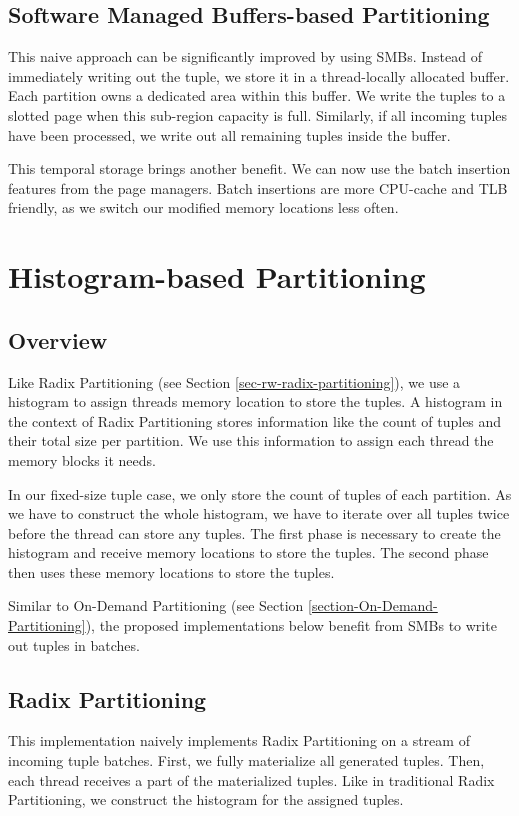 \subsection{Software Managed Buffers-based Partitioning}

This naive approach can be significantly improved by using \acfp{SMB}.
Instead of immediately writing out the tuple, we store it in a thread-locally allocated buffer.
Each partition owns a dedicated area within this buffer.
We write the tuples to a slotted page when this sub-region capacity is full.
Similarly, if all incoming tuples have been processed, we write out all remaining tuples inside the buffer.

This temporal storage brings another benefit.
We can now use the batch insertion features from the page managers.
Batch insertions are more \ac{CPU}-cache and \ac{TLB} friendly, as we switch our modified memory locations less often.

\section{Histogram-based Partitioning}\label{section-histogram-based-partitioning}
\subsection{Overview}
Like Radix Partitioning (see Section \ref{sec-rw-radix-partitioning}), we use a histogram to assign threads memory location to store the tuples.
A histogram in the context of Radix Partitioning stores information like the count of tuples and their total size per partition.
We use this information to assign each thread the memory blocks it needs.

In our fixed-size tuple case, we only store the count of tuples of each partition.
As we have to construct the whole histogram, we have to iterate over all tuples twice before the thread can store any tuples.
The first phase is necessary to create the histogram and receive memory locations to store the tuples.
The second phase then uses these memory locations to store the tuples.

Similar to On-Demand Partitioning (see Section \ref{section-On-Demand-Partitioning}), the proposed implementations below benefit from \acfp{SMB} to write out tuples in batches.
\subsection{Radix Partitioning}
This implementation naively implements Radix Partitioning on a stream of incoming tuple batches.
First, we fully materialize all generated tuples.
Then, each thread receives a part of the materialized tuples.
Like in traditional Radix Partitioning, we construct the histogram for the assigned tuples.

